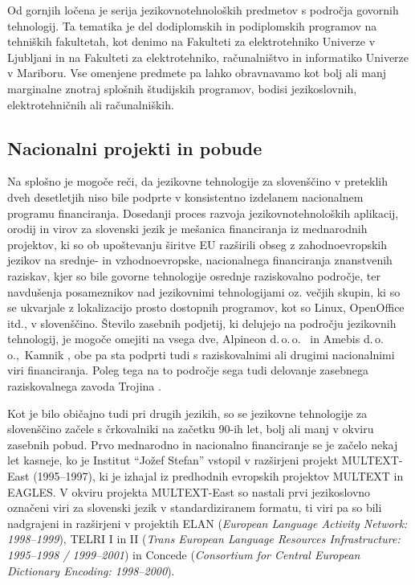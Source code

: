 \begin{multicols}{2}
Od gornjih ločena je serija jezikovnotehnoloških predmetov s področja go\-vornih tehnologij. Ta tema\-tika je del dodiplomskih in podiplomskih programov na tehniških fakultetah, kot denimo na Fakulteti za elektrotehniko Univerze v Ljub\-ljani in na Fakulteti za elektrotehniko, računalništvo in informatiko Univerze v Mariboru. Vse omenjene predmete pa lahko obravnavamo kot bolj ali manj marginalne znotraj splošnih študijskih programov, bodisi jezikoslovnih, elektrotehničnih ali računalniških.

\subsection{Nacionalni projekti in pobude}

Na splošno je mogoče reči, da jezikovne tehnologije za slovenščino v preteklih dveh desetletjih niso bile podprte v konsistentno izdelanem nacionalnem programu financiranja. Dosedanji proces razvoja jezikovnotehnoloških aplikacij, orodij in virov za slovenski jezik je mešanica financiranja iz mednarodnih projektov,  ki so ob upoštevanju širitve EU razširili obseg z zahodnoevropskih jezikov na srednje- in vzhodnoevropske, nacionalnega financiranja znanstvenih raziskav, kjer so bile go\-vorne tehnologije osrednje raziskovalno področje, ter navdušenja posameznikov nad jezikovnimi tehnologijami oz. večjih skupin, ki so se ukvarjale z lokalizacijo prosto dostopnih programov, kot so Linux, OpenOffice itd., v slovenščino.  Število zasebnih podjetij, ki delujejo na področju jezikovnih tehnologij, je mogoče omejiti na vsega dve, Alpineon d.\,o.\,o.~\cite{Alp3} in Amebis d.\,o.\,o.,~Kamnik \cite{Amb6}, obe pa sta podprti tudi s raziskovalnimi ali drugimi nacionalnimi viri financiranja. Poleg tega na to področje sega tudi delovanje zasebnega raziskovalnega zavoda Trojina \cite{Troj1}. 

Kot je bilo običajno tudi pri drugih jezikih, so se jezikovne tehnologije za slovenščino začele s črkovalniki na začetku 90-ih let, bolj ali manj v okviru zasebnih pobud. Prvo mednarodno in nacionalno financiranje se je začelo nekaj let kasneje, ko je Institut “Jožef Stefan” vstopil v razširjeni projekt MULTEXT-East (1995--1997), ki je izhajal iz predhodnih evropskih projektov MULTEXT in EAGLES. V okviru projekta MULTEXT-East so nastali prvi jezikoslovno označeni viri za slovenski jezik v standardiziranem formatu, ti viri pa so bili nadgrajeni in razširjeni v projektih ELAN (\textit{European Language Activity Network: 1998--1999}), TELRI I in II (\textit{Trans European Language Resources Infrastructure: 1995--1998 / 1999--2001}) in Concede (\textit{Consortium for Central European Dictionary Encoding: 1998--2000}).


\end{multicols}
